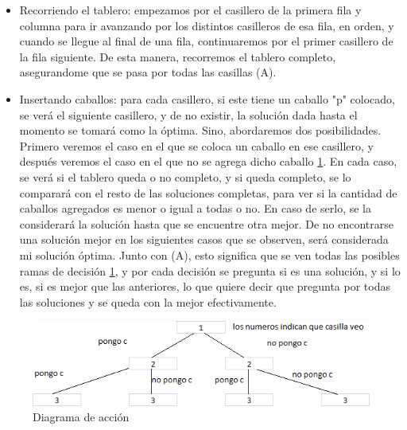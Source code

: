 \begin{itemize}
\item Recorriendo el tablero: empezamos por el casillero de la primera fila y columna para ir avanzando por los distintos casilleros de esa fila, en orden, y cuando se llegue al final de una fila, continuaremos por el primer casillero de la fila siguiente. De esta manera, recorremos el tablero completo, asegurandome que se pasa por todas las casillas (A).
\item Insertando caballos: para cada casillero, si este tiene un caballo "p" colocado, se verá el siguiente casillero, y de no existir, la solución dada hasta el momento se tomará como la óptima. Sino, abordaremos dos posibilidades. Primero veremos el caso en el que se coloca un caballo en ese casillero, y después veremos el caso en el que no se agrega dicho caballo \ref{fig:diag}. En cada caso, se verá si el tablero queda o no completo, y si queda completo, se lo comparará con el resto de las soluciones completas, para ver si la cantidad de caballos agregados es menor o igual a todas o no. En caso de serlo, se la considerará la solución hasta que se encuentre otra mejor. De no encontrarse una solución mejor en los siguientes casos que se observen, será considerada mi solución óptima. Junto con (A), esto significa que se ven todas las posibles ramas de decisión \ref{fig:diag}, y por cada decisión se pregunta si es una solución, y si lo es, si es mejor que las anteriores, lo que quiere decir que pregunta por todas las soluciones y se queda con la mejor efectivamente.
\end{itemize}
\begin{figure}[htb]
  \begin{center}
      \includegraphics[scale=1]{imagenes/tab9.png}
  \end{center}
  \caption{Diagrama de acción}\label{fig:diag}
\end{figure}

